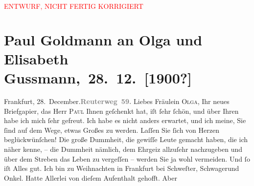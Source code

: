 
\begin{center}
            \textcolor{red}{ENTWURF, NICHT FERTIG KORRIGIERT}
                      \end{center}
            
         
         \renewcommand{\erwaehntePersonen}{Personen: Peter Altenberg, Paul Goldmann, Clementine Goldmann, Fedor Mamroth, Paul Marx, Guy de Maupassant, Vally Rosengart, Josef Rosengart, Olga Schnitzler, Elisabeth Steinrück}
         \renewcommand{\erwaehnteOrte}{Orte: Berlin, Frankfurt am Main, Reuterweg, Wien}
         \renewcommand{\erwaehnteWerke}{Werke: Rosenmontag}
               \section[ Paul Goldmann an Olga und Elisabeth Gussmann, 28. 12. {[}1900?{]}]{ Paul Goldmann an Olga und Elisabeth Gussmann, 28. 12. {[}1900?{]}}\nopagebreak{}\rehead{ }\begin{ledgroupsized}[t]{13cm}\normalsize\beginnumbering \toendnotes[C]{\smallbreak\pagebreak[2]} 
\toendnotes[C]{\smallbreak}\pstart
           \noindent{}Frankfurt, 28. December.\hfill {\pb}\textcolor{gray}{\textbf{Reuterweg 59.}}\pend
           \pstart\center{}Liebes Fräulein \textsc{Olga},\pend\pstart
           Ihr neues Briefgapier, das Herr \textsc{Paul} Ihnen geſchenkt hat, iſt ſehr ſchön, und über Ihren \label{K_L03538-1v}\label{K_L03538-1h} habe ich mich ſehr gefreut. Ich habe es nicht anders erwartet, und ich meine,
               Sie ſind auf dem Wege, etwas Großes zu werden. Laſſen Sie ſich von Herzen
               beglückwünſchen! Die große Dummheit, die gewiſſe Leute gemacht haben, die ich näher
               kenne, – die Dummheit nämlich, dem Ehrgeiz allzuſehr nachzugeben und über dem Streben
               das Leben zu vergeſſen – werden Sie ja wohl vermeiden. Und ſo iſt Alles gut. Ich bin
               zu Weihnachten in Frankfurt bei Schweſter, Schwagerund Onkel. Hatte Allerlei von dieſem Aufenthalt gehofft. Aber

\end{ledgroupsized}
